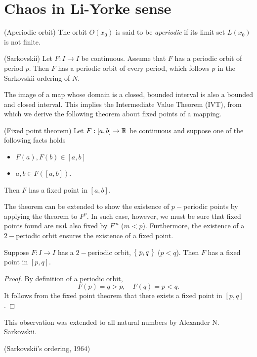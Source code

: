 \documentclass[11pt]{article}
\begin{document}
\section{Chaos in Li-Yorke sense}
\begin{definition}
  (Aperiodic orbit)
  The orbit $O(x_0)$ is said to be \textit{aperiodic} if its limit set $L(x_0)$ is not finite.
\end{definition}

\begin{proposition}
  (Sarkovskii)
  Let $F: I\to I$ be continuous. Assume that $F$ has a periodic orbit of period $p$.
  Then $F$ has a periodic orbit of every period, which follows $p$ in the Sarkovskii
  ordering of $N$.
\end{proposition}

The image of a map whose domain is a closed, bounded interval is also a bounded and closed interval.
This implies the Intermediate Value Theorem (IVT), from which we derive the following theorem about
fixed points of a mapping.
\begin{proposition}
  (Fixed point theorem)
  Let $F: [a,b] \to \mathbb{R}$ be continuous and suppose one of the following facts holds
  \begin{itemize}
    \item $F(a), F(b)\in [a,b]$
    \item $a, b\in F([a,b])$.
  \end{itemize}
  Then $F$ has a fixed point in $[a,b]$.
\end{proposition}

The theorem can be extended to show the existence of $p-$periodic points by applying the theorem to
$F^p$. In such case, however, we must be sure that fixed points found are \textbf{not} also fixed by
$F^m$ ($m < p$).
Furthermore, the existence of a $2-$periodic orbit ensures the existence of a fixed point.
\begin{proposition}
  Suppose $F: I\to I$ has a $2-$periodic orbit, $\set{p,q}$ ($p<q$). Then $F$ has a fixed point in $[p,q]$.
\end{proposition}
\begin{proof}
  By definition of a periodic orbit, 
  \begin{equation*}
    F(p) = q > p, \quad F(q) = p < q.
  \end{equation*}
  It follows from the fixed point theorem that there exists a fixed point in $[p,q]$.
\end{proof}
This observation was extended to all natural numbers by Alexander N. Sarkovskii.
\begin{definition}
  (Sarkovskii's ordering, 1964)
  
\end{definition}
\end{document}
